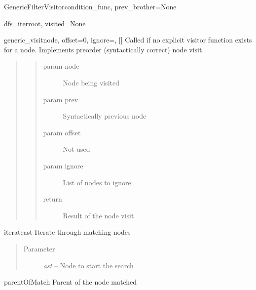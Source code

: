 \documentclass[a4paper,10pt,english]{manual}
\begin{document}
\begin{classdesc}{GenericFilterVisitor}{condition\_func, prev\_brother=None}
\begin{methoddesc}{dfs\_iter}{root, visited=None}
\begin{quote}
\begin{description}
\end{description}\end{quote}
\end{methoddesc}

\hypertarget{Backends.Common.Visitors.GenericVisitors.GenericFilterVisitor.generic\_visit}{}\begin{methoddesc}{generic\_visit}{node, offset=0, ignore=, {[}{]}}
Called if no explicit visitor function exists for a 
node. Implements preorder (syntactically correct) node visit.
\begin{quote}
\begin{quote}\begin{description}
\item[param node] \leavevmode
Node being visited

\item[param prev] \leavevmode
Syntactically previous node

\item[param offset] \leavevmode
Not used

\item[param ignore] \leavevmode
List of nodes to ignore

\item[return] \leavevmode
Result of the node visit

\end{description}\end{quote}
\end{quote}
\end{methoddesc}

\hypertarget{Backends.Common.Visitors.GenericVisitors.GenericFilterVisitor.iterate}{}\begin{methoddesc}{iterate}{ast}
Iterate through matching nodes
\begin{quote}\begin{description}
\item[Parameter] \leavevmode
\emph{ast} -- Node to start the search

\end{description}\end{quote}
\end{methoddesc}

\hypertarget{Backends.Common.Visitors.GenericVisitors.GenericFilterVisitor.parentOfMatch}{}\begin{methoddesc}{parentOfMatch}{}
Parent of the node matched


\end{methoddesc}
\end{classdesc}
\end{document}
